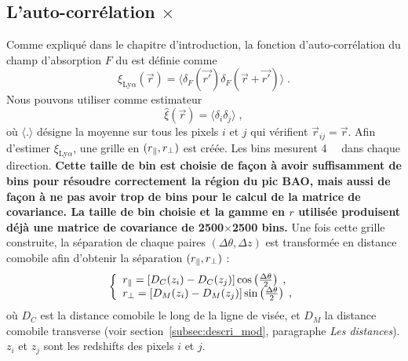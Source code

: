 \documentclass[11pt, twoside, a4paper, openright]{report}
\begin{document}
\subsection{L'auto-corrélation \lya{}$\times$\lya{}}
Comme expliqué dans le chapitre d'introduction, la fonction d'auto-corrélation du champ d'absorption $F$ du \lya{} est définie comme
\begin{equation}
  \xi_{\mathrm{Ly}\alpha}(\vec r) = \langle \delta_F(\vec{r'}) \delta_F(\vec{r} + \vec{r'}) \rangle \; .
\end{equation}
Nous pouvons utiliser comme estimateur
\begin{equation}
 \hat \xi(\vec r) = \langle \delta_i \delta_j \rangle \; ,
\end{equation}
où $\langle .\rangle$ désigne la moyenne sur tous les pixels $i$ et $j$ qui vérifient $\vec r_{ij} = \vec r$.
Afin d'estimer $\xi_{\mathrm{Ly}\alpha}$, une grille en $(r_{\parallel}{}, r_{\perp}{})$ est créée.
Les bins mesurent \SI{4}{\perh\Mpc} dans chaque direction.
\textbf{Cette taille de bin est choisie de façon à avoir suffisamment de bins pour résoudre correctement la région du pic BAO, mais aussi de façon à ne pas avoir trop de bins pour le calcul de la matrice de covariance. La taille de bin choisie et la gamme en $r$ utilisée produisent déjà une matrice de covariance de \num{2500}$\times$\num{2500} bins. }
Une fois cette grille construite, la séparation de chaque paires $(\Delta \theta, \Delta z)$ est transformée en distance comobile afin d'obtenir la séparation $(r_{\parallel}{}, r_{\perp}{})$ :
\begin{equation}
  \left\{
    \begin{array}{l}
      r_{\parallel}{} = \left[D_C(z_i) - D_C(z_j)\right] \cos\left(\frac{\Delta \theta}{2}\right) \; , \\
      r_{\perp}{} = \left[D_M(z_i) - D_M(z_j)\right] \sin\left(\frac{\Delta \theta}{2}\right) \; ,
    \end{array}
  \right. 
\end{equation}
où $D_C$ est la distance comobile le long de la ligne de visée, et $D_M$ la distance comobile transverse (voir section~\ref{subsec:descri_mod}, paragraphe \emph{Les distances}). $z_i$ et $z_j$ sont les redshifts des pixels $i$ et $j$.
\end{document}
